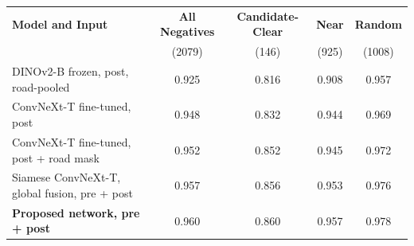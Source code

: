 \begin{tabularx}{\textwidth}{>{\raggedright\arraybackslash}p{5.6cm}CCCC}
\toprule
\textbf{Model and Input} & \textbf{All Negatives} & \textbf{Candidate-Clear} & \textbf{Near} & \textbf{Random} \\
 & (2079) & (146) & (925) & (1008) \\
\midrule
DINOv2-B frozen, post, road-pooled & 0.925 & 0.816 & 0.908 & 0.957 \\
ConvNeXt-T fine-tuned, post & 0.948 & 0.832 & 0.944 & 0.969 \\
ConvNeXt-T fine-tuned, post + road mask & 0.952 & 0.852 & 0.945 & 0.972 \\
Siamese ConvNeXt-T, global fusion, pre + post & 0.957 & 0.856 & 0.953 & 0.976 \\
\textbf{Proposed network, pre + post} & 0.960 & 0.860 & 0.957 & 0.978 \\
\bottomrule
\end{tabularx}
